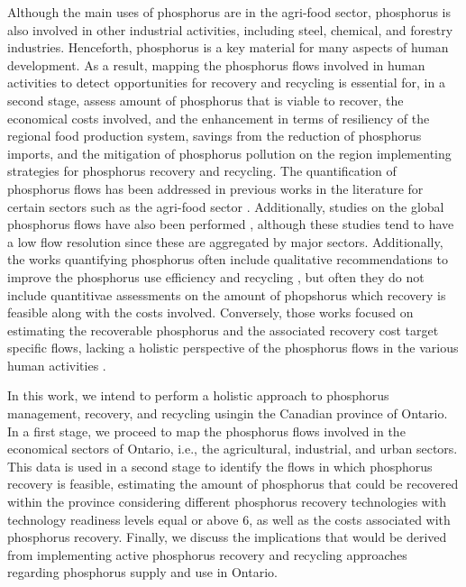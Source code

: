 \documentclass[authoryear]{elsarticle}
\begin{document}
Although the main uses of phosphorus are in the agri-food sector, phosphorus is also involved in other industrial activities, including steel, chemical, and forestry industries. Henceforth, phosphorus is a key material for many aspects of human development. As a result, mapping the phosphorus flows involved in human activities to detect opportunities for recovery and recycling is essential for, in a second stage, assess amount of phosphorus that is viable to recover, the economical costs involved, and the enhancement in terms of resiliency of the regional food production system, savings from the reduction of phosphorus imports, and the mitigation of phosphorus pollution on the region implementing strategies for phosphorus recovery and recycling. The quantification of phosphorus flows has been addressed in previous works in the literature for certain sectors such as the agri-food sector \citep{boh2020nitrogen, zhou2021model, nesme2018global}. Additionally, studies on the global phosphorus flows have also been performed \citep{villalba2008global, chen2016half}, although these studies tend to have a low flow resolution since these are aggregated by major sectors. Additionally, the works quantifying phosphorus often include qualitative recommendations to improve the phosphorus use efficiency and recycling \citep{van2016phosphorus, senthilkumar2012conceptual}, but often they do not include quantitivae assessments on the amount of phopshorus which recovery is feasible along with the costs involved. Conversely, those works focused on estimating the recoverable phosphorus and the associated recovery cost target specific flows, lacking a holistic perspective of the phosphorus flows in the various human activities \citep{martin2021geospatial, sampat2018technologies}.

In this work, we intend to perform a holistic approach to phosphorus management,
recovery, and recycling usingin the Canadian province of Ontario. In a first stage, we proceed to map the phosphorus flows involved in the economical sectors of Ontario, i.e., the agricultural, industrial, and urban sectors. This data is used in a second stage to identify the flows in which phosphorus recovery is feasible, estimating the amount of phosphorus that could be recovered within the province considering
different phosphorus recovery technologies with technology readiness levels equal or above 6, as well as the costs associated with phosphorus recovery. Finally, we discuss the implications that would be derived from implementing active phosphorus recovery and recycling approaches regarding phosphorus supply and use in Ontario.
\end{document}
